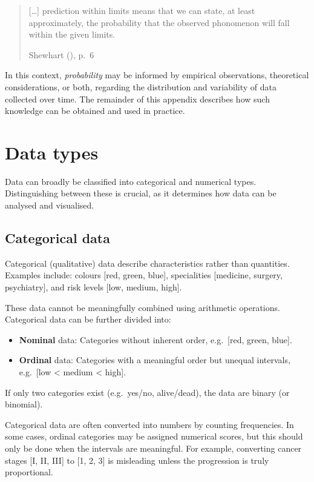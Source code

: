 \documentclass[
]{book}
\providecommand{\tightlist}{%
  \setlength{\itemsep}{0pt}\setlength{\parskip}{0pt}}
\begin{document}
\begin{quote}
{[}\ldots{]} prediction within limits means that we can state, at least
approximately, the probability that the observed phonomenon will fall
within the given limits.

Shewhart (), p.~6
\end{quote}

In this context, \emph{probability} may be informed by empirical
observations, theoretical considerations, or both, regarding the
distribution and variability of data collected over time. The remainder
of this appendix describes how such knowledge can be obtained and used
in practice.

\section{Data types}\label{data-types}

Data can broadly be classified into categorical and numerical types.
Distinguishing between these is crucial, as it determines how data can
be analysed and visualised.

\subsection{Categorical data}\label{categorical-data}

Categorical (qualitative) data describe characteristics rather than
quantities. Examples include: colours {[}red, green, blue{]},
specialities {[}medicine, surgery, psychiatry{]}, and risk levels
{[}low, medium, high{]}.

These data cannot be meaningfully combined using arithmetic operations.
Categorical data can be further divided into:

\begin{itemize}
\tightlist
\item
  \textbf{Nominal} data: Categories without inherent order, e.g.~{[}red,
  green, blue{]}.
\item
  \textbf{Ordinal} data: Categories with a meaningful order but unequal
  intervals, e.g.~{[}low \textless{} medium \textless{} high{]}.
\end{itemize}

If only two categories exist (e.g.~yes/no, alive/dead), the data are
binary (or binomial).

Categorical data are often converted into numbers by counting
frequencies. In some cases, ordinal categories may be assigned numerical
scores, but this should only be done when the intervals are meaningful.
For example, converting cancer stages {[}I, II, III{]} to
{[}\hspace{0pt}1, 2, 3{]} is misleading unless the progression is truly
proportional.
\end{document}
